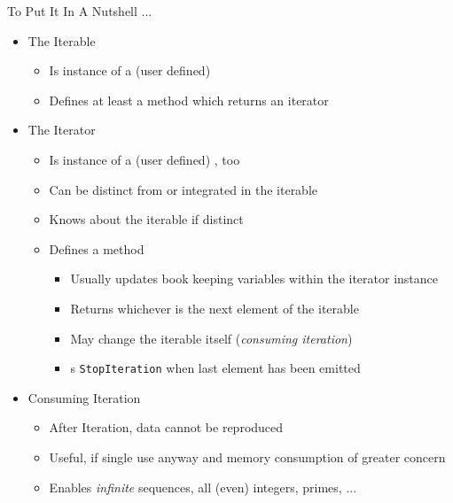 \begin{frame}{To Put It In A Nutshell ...}
%
\begin{itemize}
\item The Iterable
	\begin{itemize}
	\item Is instance of a (user defined) 
	\item Defines at least a method  which returns an iterator
	\end{itemize}
\item The Iterator
	\begin{itemize}
	\item Is instance of a (user defined) , too
	\item Can be distinct from or integrated in the iterable
	\item Knows about the iterable if distinct
	\item Defines a method 
		\begin{itemize}
		\item Usually updates book keeping variables within the iterator instance
		\item Returns whichever is the next element of the iterable
		\item May change the iterable itself (\Thus \emph{consuming iteration})
		\item {}s \texttt{StopIteration} when last element has been emitted
		\end{itemize}
	\end{itemize}
\item Consuming Iteration
	\begin{itemize}
	\item After Iteration, data cannot be reproduced
	\item Useful, if single use anyway and memory consumption of greater concern
	\item Enables \emph{infinite} sequences, \zB all (even) integers, primes, ...
	\end{itemize}
\end{itemize}
%
\end{frame}


